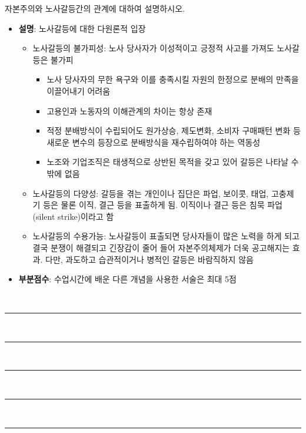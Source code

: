 \documentclass[11pt,answers]{exam} %
\begin{document}
\begin{questions}
\question[10] 자본주의와 노사갈등간의 관계에 대하여 설명하시오.
    \ifprintanswers\relax
        \begin{itemize}
            \item \textbf{설명}: 노사갈등에 대한 다원론적 입장
            \begin{itemize}
                \item 노사갈등의 불가피성: 노사 당사자가 이성적이고 긍정적 사고를 가져도 노사갈등은 불가피
                \begin{itemize}
                    \item 노사 당사자의 무한 욕구와 이를 충족시킬 자원의 한정으로 분배의 만족을 이끌어내기 어려움
                    \item 고용인과 노동자의 이해관계의 차이는 항상 존재
                    \item 적정 분배방식이 수립되어도 원가상승, 제도변화, 소비자 구매패턴 변화 등 새로운 변수의 등장으로 분배방식을 재수립하여야 하는 역동성
                    \item 노조와 기업조직은 태생적으로 상반된 목적을 갖고 있어 갈등은 나타날 수 밖에 없음 
                \end{itemize}
                \item 노사갈등의 다양성: 갈등을 겪는 개인이나 집단은 파업, 보이콧, 태업, 고충제기 등은 물론 이직, 결근 등을 표출하게 됨. 이직이나 결근 등은 침묵 파업 (silent strike)이라고 함
                \item 노사갈등의 수용가능: 노사갈등이 표출되면 당사자들이 많은 노력을 하게 되고 결국 분쟁이 해결되고 긴장감이 줄어 들어 자본주의체제가 더욱 공고해지는 효과. 다만, 과도하고 습관적이거나 병적인 갈등은 바람직하지 않음
            \end{itemize}
            \item \textbf{부분점수}: 수업시간에 배운 다른 개념을 사용한 서술은 최대 5점
        \end{itemize}
    \else
        \\[3pt]
        \rule{\linewidth}{0.4pt} \\[3pt]
        \rule{\linewidth}{0.4pt} \\[3pt]
        \rule{\linewidth}{0.4pt} \\[3pt]
        \rule{\linewidth}{0.4pt} \\[3pt]
        \rule{\linewidth}{0.4pt}
    \fi

\end{questions}
\end{document}

